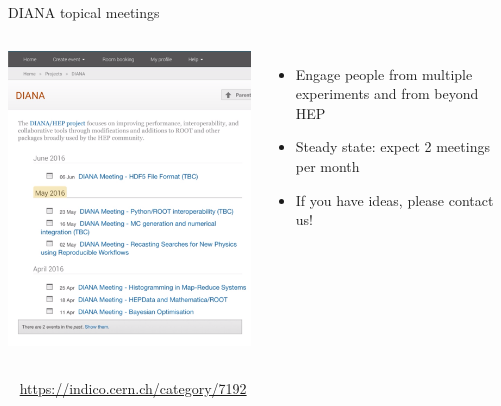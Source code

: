 \documentclass{beamer}
\begin{document}
\begin{frame}{DIANA topical meetings}
\vspace{0.25 cm}
\begin{columns}
\includegraphics[width=\linewidth]{topical_meetings.png}

\begin{itemize}\setlength{\itemsep}{0.3 cm}
\item Engage people from multiple experiments and from beyond HEP
\item Steady state: expect 2 meetings per month
\item If you have ideas, please contact us!
\end{itemize}
\end{columns}

\vspace{0.25 cm}
\mbox{ } \hfill \textcolor{blue}{\small \url{https://indico.cern.ch/category/7192}} \hfill \mbox{ }
\end{frame}
\end{document}
